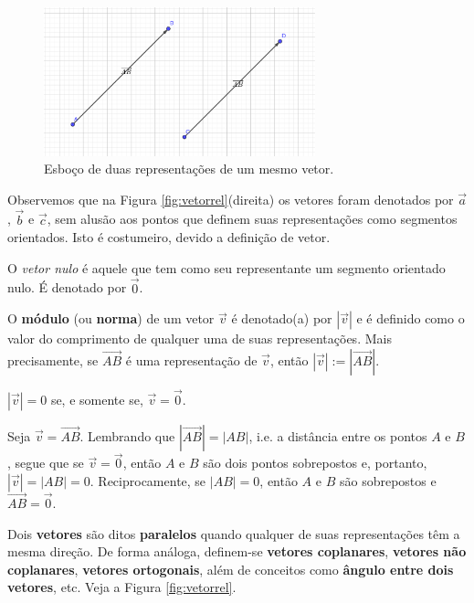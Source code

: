 \begin{figure}[h!]
  \centering
  \includegraphics[width=0.7\textwidth]{./cap_vetor/dados/fig_vetor/fig_vetor}
  \caption{Esboço de duas representações de um mesmo vetor.}
  \label{fig:vetor}
\end{figure}

Observemos que na Figura \ref{fig:vetorrel}(direita) os vetores foram denotados por $\vec{a}$, $\vec{b}$ e $\vec{c}$, sem alusão aos pontos que definem suas representações como segmentos orientados. Isto é costumeiro, devido a definição de vetor.

O \emph{vetor nulo} é aquele que tem como seu representante um segmento orientado nulo. É denotado por $\vec{0}$.

O {\bf módulo} (ou {\bf norma}) de um vetor $\vec{v}$ é denotado(a) por $|\vec{v}|$ e é definido como o valor do comprimento de qualquer uma de suas representações. Mais precisamente, se $\overrightarrow{AB}$ é uma representação de $\vec{v}$, então $|\vec{v}| := |\overrightarrow{AB}|$.

\begin{obs}
  $|\vec{v}| = 0$ se, e somente se, $\vec{v} = \vec{0}$.

  Seja $\vec{v} = \overrightarrow{AB}$. Lembrando que $|\overrightarrow{AB}| = |AB|$, i.e. a distância entre os pontos $A$ e $B$, segue que se $\vec{v} = \vec{0}$, então $A$ e $B$ são dois pontos sobrepostos e, portanto, $|\vec{v}| = |AB| = 0$. Reciprocamente, se $|AB| = 0$, então $A$ e $B$ são sobrepostos e $\overrightarrow{AB} = \vec{0}$.
\end{obs}

Dois {\bf vetores} são ditos {\bf paralelos}  quando qualquer de suas representações têm a mesma direção. De forma análoga, definem-se {\bf vetores coplanares}, {\bf vetores não coplanares}, {\bf vetores ortogonais}, além de conceitos como {\bf ângulo entre dois vetores}, etc. Veja a Figura \ref{fig:vetorrel}.

